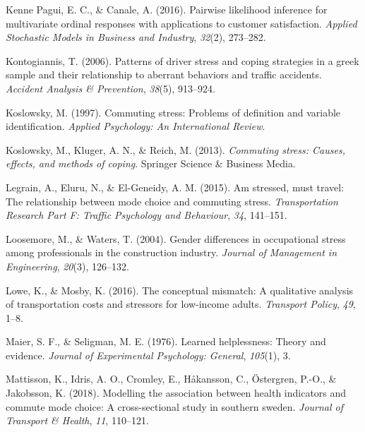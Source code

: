 \documentclass[
11pt, %
oneside, %
english, %
singlespacing, %
]{macthesis} %
\newlength{\cslhangindent}
\newenvironment{CSLReferences}[2] %
 {%
  \setlength{\parindent}{0pt}
  \ifodd #1 \everypar{\setlength{\hangindent}{\cslhangindent}}\ignorespaces\fi
  \ifnum #2 > 0
  \setlength{\parskip}{#2\baselineskip}
  \fi
 }%
 {}
\begin{document}
\begin{CSLReferences}{1}{0}
\leavevmode{}%
Kenne Pagui, E. C., \& Canale, A. (2016). Pairwise likelihood inference for multivariate ordinal responses with applications to customer satisfaction. \emph{Applied Stochastic Models in Business and Industry}, \emph{32}(2), 273--282.

\leavevmode{}%
Kontogiannis, T. (2006). Patterns of driver stress and coping strategies in a greek sample and their relationship to aberrant behaviors and traffic accidents. \emph{Accident Analysis \& Prevention}, \emph{38}(5), 913--924.

\leavevmode{}%
Koslowsky, M. (1997). Commuting stress: Problems of definition and variable identification. \emph{Applied Psychology: An International Review}.

\leavevmode{}%
Koslowsky, M., Kluger, A. N., \& Reich, M. (2013). \emph{Commuting stress: Causes, effects, and methods of coping}. Springer Science \& Business Media.

\leavevmode{}%
Legrain, A., Eluru, N., \& El-Geneidy, A. M. (2015). Am stressed, must travel: The relationship between mode choice and commuting stress. \emph{Transportation Research Part F: Traffic Psychology and Behaviour}, \emph{34}, 141--151.

\leavevmode{}%
Loosemore, M., \& Waters, T. (2004). Gender differences in occupational stress among professionals in the construction industry. \emph{Journal of Management in Engineering}, \emph{20}(3), 126--132.

\leavevmode{}%
Lowe, K., \& Mosby, K. (2016). The conceptual mismatch: A qualitative analysis of transportation costs and stressors for low-income adults. \emph{Transport Policy}, \emph{49}, 1--8.

\leavevmode{}%
Maier, S. F., \& Seligman, M. E. (1976). Learned helplessness: Theory and evidence. \emph{Journal of Experimental Psychology: General}, \emph{105}(1), 3.

\leavevmode{}%
Mattisson, K., Idris, A. O., Cromley, E., Håkansson, C., Östergren, P.-O., \& Jakobsson, K. (2018). Modelling the association between health indicators and commute mode choice: A cross-sectional study in southern sweden. \emph{Journal of Transport \& Health}, \emph{11}, 110--121.


\end{CSLReferences}
\end{document}
